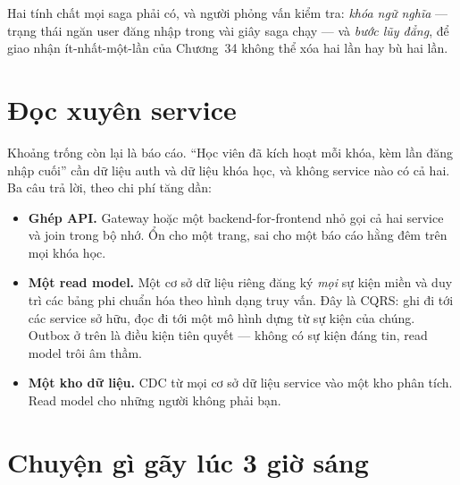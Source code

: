 Hai tính chất mọi saga phải có, và người phỏng vấn kiểm tra:
\emph{khóa ngữ nghĩa} --- trạng thái  ngăn user đăng nhập
trong vài giây saga chạy --- và \emph{bước lũy đẳng}, để giao nhận
ít-nhất-một-lần của Chương~34 không thể xóa hai lần hay bù hai lần.

\section{Đọc xuyên service}

Khoảng trống còn lại là báo cáo. ``Học viên đã kích hoạt mỗi khóa, kèm
lần đăng nhập cuối'' cần dữ liệu auth và dữ liệu khóa học, và không
service nào có cả hai. Ba câu trả lời, theo chi phí tăng dần:

\begin{itemize}
  \item \textbf{Ghép API.} Gateway hoặc một backend-for-frontend nhỏ gọi
  cả hai service và join trong bộ nhớ. Ổn cho một trang, sai cho một
  báo cáo hằng đêm trên mọi khóa học.
  \item \textbf{Một read model.} Một cơ sở dữ liệu 
  riêng đăng ký \emph{mọi} sự kiện miền và duy trì các bảng phi chuẩn
  hóa theo hình dạng truy vấn. Đây là CQRS: ghi đi tới các service sở
  hữu, đọc đi tới một mô hình dựng từ sự kiện của chúng. Outbox ở trên
  là điều kiện tiên quyết --- không có sự kiện đáng tin, read model trôi
  âm thầm.
  \item \textbf{Một kho dữ liệu.} CDC từ mọi cơ sở dữ liệu service vào
  một kho phân tích. Read model cho những người không phải bạn.
\end{itemize}

\section{Chuyện gì gãy lúc 3 giờ sáng}

